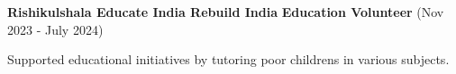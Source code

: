 \documentclass[10pt, A4]{article}
\begin{document}
	\vspace{0.1 cm}
	
	\begin{twocolentry}{
			\textbf{Rishikulshala Educate India Rebuild India}
		}
		\textbf{Education Volunteer} (Nov 2023 - July 2024)
		\begin{highlights}
			\item Supported educational initiatives by tutoring poor childrens in various subjects.
		\end{highlights}
	\end{twocolentry}	
	
	
\end{document}
